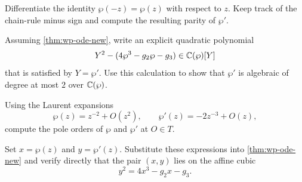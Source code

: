 \begin{exercise}
Differentiate the identity \(\wp(-z)=\wp(z)\) with respect to \(z\).  Keep track
of the chain-rule minus sign and compute the resulting parity of \(\wp'\).
\end{exercise}

\begin{exercise}
Assuming \cref{thm:wp-ode-new}, write an explicit quadratic polynomial
\[
  Y^2-(4\wp^3-g_2\wp-g_3)\in \mathbb{C}(\wp)[Y]
\]
that is satisfied by \(Y=\wp'\).  Use this calculation to show that \(\wp'\) is
algebraic of degree at most \(2\) over \(\mathbb{C}(\wp)\).
\end{exercise}

\begin{exercise}
Using the Laurent expansions
\[
  \wp(z)=z^{-2}+O(z^2),\qquad \wp'(z)=-2z^{-3}+O(z),
\]
compute the pole orders of \(\wp\) and \(\wp'\) at \(O\in T\).
\end{exercise}

\begin{exercise}
Set \(x=\wp(z)\) and \(y=\wp'(z)\).  Substitute these expressions into
\cref{thm:wp-ode-new} and verify directly that the pair \((x,y)\) lies on the
affine cubic
\[
  y^2=4x^3-g_2x-g_3.
\]
\end{exercise}
